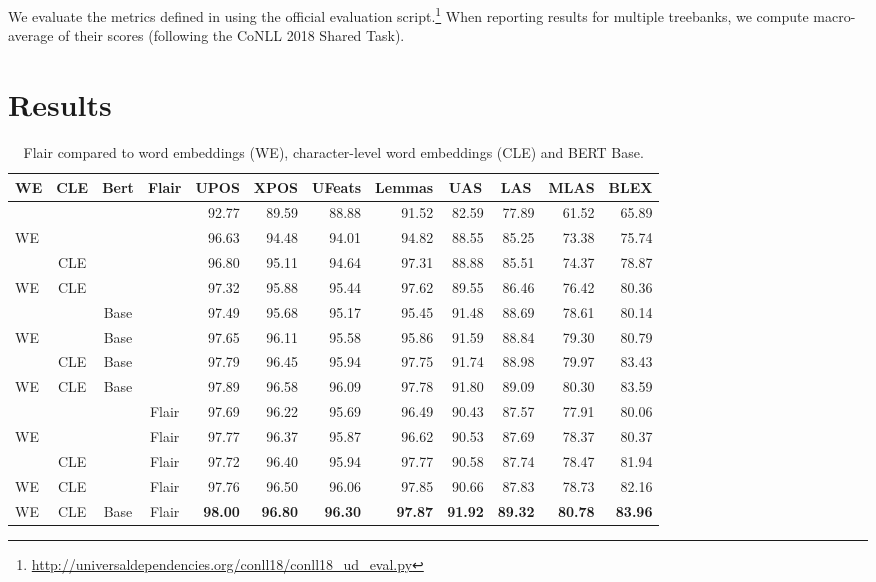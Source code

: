\documentclass[11pt,a4paper]{article}
\begin{document}
We evaluate the metrics defined in \citet{CoNLL2018} using the official
evaluation
script.\footnote{\scriptsize\url{http://universaldependencies.org/conll18/conll18_ud_eval.py}}
When reporting results for multiple treebanks, we compute macro-average of
their scores (following the CoNLL 2018 Shared Task).

\section{Results}
\label{section:results}

\begin{table*}[t]
  \begin{center}
\setlength{\tabcolsep}{5pt}
    \begin{tabular}{l|c|c|c||r|r|r|r|r|r|r|r}
\multicolumn{1}{c|}{WE} & \multicolumn{1}{c|}{CLE} & \multicolumn{1}{c|}{Bert} & \multicolumn{1}{c||}{Flair} & \multicolumn{1}{c|}{UPOS} & \multicolumn{1}{c|}{XPOS} & \multicolumn{1}{c|}{UFeats} & \multicolumn{1}{c|}{Lemmas} & \multicolumn{1}{c|}{UAS} & \multicolumn{1}{c|}{LAS} & \multicolumn{1}{c|}{MLAS} & \multicolumn{1}{c}{BLEX}\\\hline\hline
 &  &  &  & 92.77 & 89.59 & 88.88 & 91.52 & 82.59 & 77.89 & 61.52 & 65.89\\\hline
WE &  &  &  & 96.63 & 94.48 & 94.01 & 94.82 & 88.55 & 85.25 & 73.38 & 75.74\\\hline
 & CLE &  &  & 96.80 & 95.11 & 94.64 & 97.31 & 88.88 & 85.51 & 74.37 & 78.87\\\hline
WE & CLE &  &  & 97.32 & 95.88 & 95.44 & 97.62 & 89.55 & 86.46 & 76.42 & 80.36\\\hline
\hline
 &  & Base &  & 97.49 & 95.68 & 95.17 & 95.45 & 91.48 & 88.69 & 78.61 & 80.14\\\hline
WE &  & Base &  & 97.65 & 96.11 & 95.58 & 95.86 & 91.59 & 88.84 & 79.30 & 80.79\\\hline
 & CLE & Base &  & 97.79 & 96.45 & 95.94 & 97.75 & 91.74 & 88.98 & 79.97 & 83.43\\\hline
WE & CLE & Base &  & 97.89 & 96.58 & 96.09 & 97.78 & 91.80 & 89.09 & 80.30 & 83.59\\\hline
\hline
 &  &  & Flair & 97.69 & 96.22 & 95.69 & 96.49 & 90.43 & 87.57 & 77.91 & 80.06\\\hline
WE &  &  & Flair & 97.77 & 96.37 & 95.87 & 96.62 & 90.53 & 87.69 & 78.37 & 80.37\\\hline
 & CLE &  & Flair & 97.72 & 96.40 & 95.94 & 97.77 & 90.58 & 87.74 & 78.47 & 81.94\\\hline
WE & CLE &  & Flair & 97.76 & 96.50 & 96.06 & 97.85 & 90.66 & 87.83 & 78.73 & 82.16\\\hline
\hline
WE & CLE & Base & Flair & \bf 98.00 & \bf 96.80 & \bf 96.30 & \bf 97.87 & \bf 91.92 & \bf 89.32 & \bf 80.78 & \bf 83.96\\\hline
\end{tabular}
   \end{center}
  \caption{Flair compared to word embeddings (WE), character-level word
  embeddings (CLE) and BERT Base.}
  \label{table:flair}
\end{table*}
\end{document}
